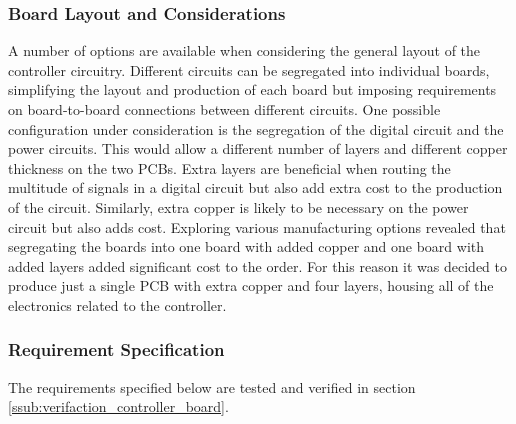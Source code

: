\subsubsection{Board Layout and Considerations} %
\label{ssub:board_layout_and_considerations}
A number of options are available when considering the general layout of the controller circuitry.
Different circuits can be segregated into individual boards, simplifying the layout and production of each board but imposing requirements on board-to-board connections between different circuits.
One possible configuration under consideration is the segregation of the digital circuit and the power circuits.
This would allow a different number of layers and different copper thickness on the two PCBs.
Extra layers are beneficial when routing the multitude of signals in a digital circuit but also add extra cost to the production of the circuit.
Similarly, extra copper is likely to be necessary on the power circuit but also adds cost.
Exploring various manufacturing options revealed that segregating the boards into one board with added copper and one board with added layers added significant cost to the order.
For this reason it was decided to produce just a single PCB with extra copper and four layers, housing all of the electronics related to the controller.

\clearpage
\subsubsection{Requirement Specification}
The requirements specified below are tested and verified in section \ref{ssub:verifaction_controller_board}.
